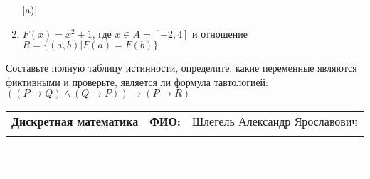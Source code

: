 \documentclass[10pt]{exam}
\newcommand{\class}{Дискретная математика}
\newcommand{\examdate}{}
\begin{document}
\begin{questions}
\begin{enumerate} [a)]
\item $F(x)=x^{2}+1$, где $x \in A = [-2, 4]$ и отношение $R = \{(a,b)|F(a) = F(b)\}$
\end{enumerate}\question Составьте полную таблицу истинности, определите, какие переменные являются фиктивными и проверьте, является ли формула тавтологией:
$(( P \rightarrow Q) \land (Q \rightarrow P)) \rightarrow (P \rightarrow R)$

\end{questions}
\newpage
\begin{flushright}
\begin{tabular}{p{2.8in} r l}
\textbf{\class} & \textbf{ФИО:} &Шлегель Александр Ярославович
\\

\textbf{\examdate} &&\\
\end{tabular}\\
\end{flushright}
\rule[1ex]{\textwidth}{.1pt}
\end{document}

